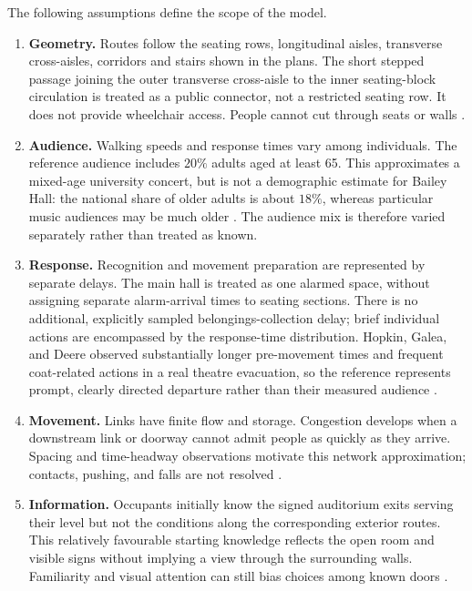 \documentclass[11pt,a4paper]{article}
\begin{document}
The following assumptions define the scope of the model.
\begin{enumerate}[label=\arabic*.]
\item \textbf{Geometry.} Routes follow the seating rows, longitudinal aisles, transverse cross-aisles, corridors and stairs shown in the plans. The short stepped passage joining the outer transverse cross-aisle to the inner seating-block circulation is treated as a public connector, not a restricted seating row. It does not provide wheelchair access. People cannot cut through seats or walls \cite{brief}.

\item \textbf{Audience.} Walking speeds and response times vary among individuals. The reference audience includes $20\%$ adults aged at least 65. This approximates a mixed-age university concert, but is not a demographic estimate for Bailey Hall: the national share of older adults is about $18\%$, whereas particular music audiences may be much older \cite{census,nidi}. The audience mix is therefore varied separately rather than treated as known.

\item \textbf{Response.} Recognition and movement preparation are represented by separate delays. The main hall is treated as one alarmed space, without assigning separate alarm-arrival times to seating sections. There is no additional, explicitly sampled belongings-collection delay; brief individual actions are encompassed by the response-time distribution. Hopkin, Galea, and Deere observed substantially longer pre-movement times and frequent coat-related actions in a real theatre evacuation, so the reference represents prompt, clearly directed departure rather than their measured audience \cite{hopkin}.

\item \textbf{Movement.} Links have finite flow and storage. Congestion develops when a downstream link or doorway cannot admit people as quickly as they arrive. Spacing and time-headway observations motivate this network approximation; contacts, pushing, and falls are not resolved \cite{seyfried,johansson}.

\item \textbf{Information.} Occupants initially know the signed auditorium exits serving their level but not the conditions along the corresponding exterior routes. This relatively favourable starting knowledge reflects the open room and visible signs without implying a view through the surrounding walls. Familiarity and visual attention can still bias choices among known doors \cite{fu2023,fu2024}.


\end{enumerate}
\end{document}

